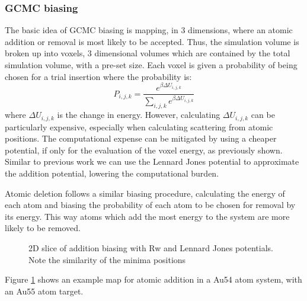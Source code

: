 \subsubsection{GCMC biasing}
The basic idea of GCMC biasing is mapping, in 3 dimensions, where an atomic addition or removal is most likely to be accepted.
Thus, the simulation volume is broken up into voxels, 3 dimensional volumes which are contained by the total simulation volume, with a pre-set size.
Each voxel is given a probability of being chosen for a trial insertion where the probability is:
\begin{equation}
  P_{i, j, k} = \frac{e^{\beta \Delta U_{i, j, k}}}{\sum_{i, j, k}e^{\beta \Delta U_{i, j, k}}}
\end{equation}
where $\Delta U_{i, j, k}$ is the change in energy.
However, calculating $\Delta U_{i, j, k}$ can be particularly expensive, especially when calculating scattering from atomic positions.
The computational expense can be mitigated by using a cheaper potential, if only for the evaluation of the voxel energy, as previously shown.
Similar to previous work we can use the Lennard Jones potential to approximate the addition potential, lowering the computational burden. \cite{Snurr1993}

Atomic deletion follows a similar biasing procedure, calculating the energy of each atom and biasing the probability of each atom to be chosen for removal by its energy.
This way atoms which add the most energy to the system are more likely to be removed.

\begin{figure}
	\caption[2D slice of addition biasing with Rw and Lennard Jones potentials.]{2D slice of addition biasing with Rw and Lennard Jones potentials. Note the similarity of the minima positions}
	\label{fig:biasing}
\end{figure}
Figure \ref{fig:biasing} shows an example map for atomic addition in a Au54 atom system, with an Au55 atom target.
